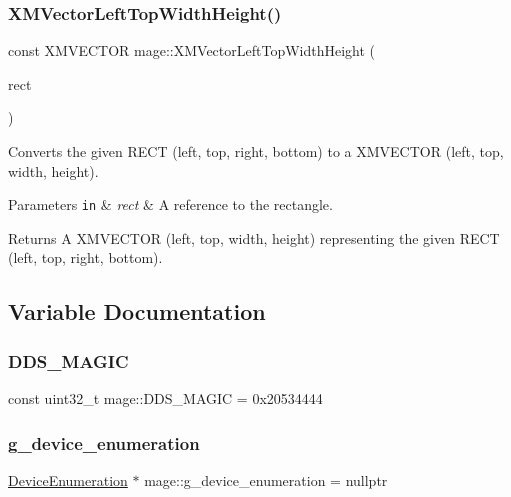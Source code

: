 \subsubsection{\texorpdfstring{X\+M\+Vector\+Left\+Top\+Width\+Height()}{XMVectorLeftTopWidthHeight()}}
{\footnotesize\ttfamily const X\+M\+V\+E\+C\+T\+OR mage\+::\+X\+M\+Vector\+Left\+Top\+Width\+Height (\begin{DoxyParamCaption}\item[{const R\+E\+CT \&}]{rect }\end{DoxyParamCaption})\hspace{0.3cm}{\ttfamily [noexcept]}}

Converts the given {\ttfamily R\+E\+CT} (left, top, right, bottom) to a {\ttfamily X\+M\+V\+E\+C\+T\+OR} (left, top, width, height).


\begin{DoxyParams}[1]{Parameters}
\mbox{\tt in}  & {\em rect} & A reference to the rectangle. \\
\hline
\end{DoxyParams}
\begin{DoxyReturn}{Returns}
A {\ttfamily X\+M\+V\+E\+C\+T\+OR} (left, top, width, height) representing the given {\ttfamily R\+E\+CT} (left, top, right, bottom). 
\end{DoxyReturn}


\subsection{Variable Documentation}
\hypertarget{namespacemage_a52f784e41b51fee843891c6b5e9be479}{}\label{namespacemage_a52f784e41b51fee843891c6b5e9be479} 
\subsubsection{\texorpdfstring{D\+D\+S\+\_\+\+M\+A\+G\+IC}{DDS\_MAGIC}}
{\footnotesize\ttfamily const uint32\+\_\+t mage\+::\+D\+D\+S\+\_\+\+M\+A\+G\+IC = 0x20534444}

\hypertarget{namespacemage_a73e54b9b368875ed0281ced59e2fca7e}{}\label{namespacemage_a73e54b9b368875ed0281ced59e2fca7e} 
\subsubsection{\texorpdfstring{g\+\_\+device\+\_\+enumeration}{g\_device\_enumeration}}
{\footnotesize\ttfamily \hyperlink{classmage_1_1_device_enumeration}{Device\+Enumeration} $\ast$ mage\+::g\+\_\+device\+\_\+enumeration = nullptr}

